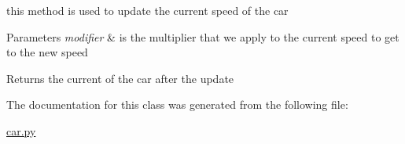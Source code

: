 this method is used to update the current speed of the car 


\begin{DoxyParams}{Parameters}
{\em modifier} & is the multiplier that we apply to the current speed to get to the new speed \\
\hline
\end{DoxyParams}
\begin{DoxyReturn}{Returns}
the current of the car after the update 
\end{DoxyReturn}


The documentation for this class was generated from the following file\+:\begin{DoxyCompactItemize}
\item 
\mbox{\hyperlink{car_8py}{car.\+py}}\end{DoxyCompactItemize}

